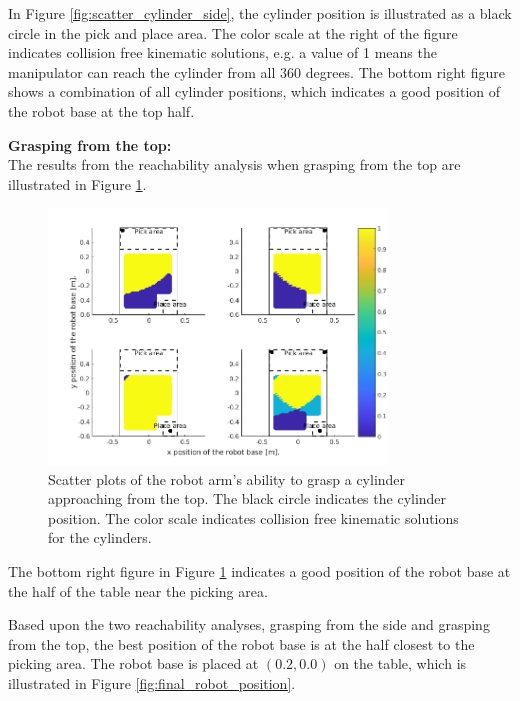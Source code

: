 \documentclass[../main.tex]{subfiles}
\begin{document}
In Figure \ref{fig:scatter_cylinder_side}, the cylinder position is illustrated as a black circle in the pick and place area. The color scale at the right of the figure indicates collision free kinematic solutions, e.g. a value of 1 means the manipulator can reach the cylinder from all $360$ degrees. The bottom right figure shows a combination of all cylinder positions, which indicates a good position of the robot base at the top half.

\textbf{Grasping from the top:}\\
The results from the reachability analysis when grasping from the top are illustrated in Figure \ref{fig:scatter_cylinder_top}.

\begin{figure}[H]
    \centering
    \includegraphics[width=0.8\textwidth]{figures/workcell_setup/scatter_cylinder_top.png}
    \caption{Scatter plots of the robot arm's ability to grasp a cylinder approaching from the top. The black circle indicates the cylinder position. The color scale indicates collision free kinematic solutions for the cylinders.}
    \label{fig:scatter_cylinder_top}
\end{figure}

The bottom right figure in Figure \ref{fig:scatter_cylinder_top} indicates a good position of the robot base at the half of the table near the picking area. 

Based upon the two reachability analyses, grasping from the side and grasping from the top, the best position of the robot base is at the half closest to the picking area. The robot base is placed at $(0.2, 0.0)$ on the table, which is illustrated in Figure \ref{fig:final_robot_position}.
\end{document}

